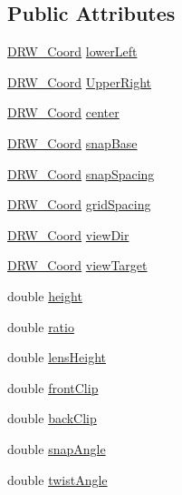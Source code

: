 \subsection*{Public Attributes}
\begin{DoxyCompactItemize}
\item 
\hyperlink{class_d_r_w___coord}{D\+R\+W\+\_\+\+Coord} \hyperlink{class_d_r_w___vport_a27df49d3aacabe83be11ac29463f75c1}{lower\+Left}
\item 
\hyperlink{class_d_r_w___coord}{D\+R\+W\+\_\+\+Coord} \hyperlink{class_d_r_w___vport_ae63541133c20a69a6e13f25191e02b05}{Upper\+Right}
\item 
\hyperlink{class_d_r_w___coord}{D\+R\+W\+\_\+\+Coord} \hyperlink{class_d_r_w___vport_a56104afc60b9fb0b8c6682982f92a45e}{center}
\item 
\hyperlink{class_d_r_w___coord}{D\+R\+W\+\_\+\+Coord} \hyperlink{class_d_r_w___vport_a152be2cc28b499c29e9302efa54e001c}{snap\+Base}
\item 
\hyperlink{class_d_r_w___coord}{D\+R\+W\+\_\+\+Coord} \hyperlink{class_d_r_w___vport_a19aa53d1282cb737b21fa3d3b60d3b20}{snap\+Spacing}
\item 
\hyperlink{class_d_r_w___coord}{D\+R\+W\+\_\+\+Coord} \hyperlink{class_d_r_w___vport_a0284747ef8bda7287e99534d9fdc75e5}{grid\+Spacing}
\item 
\hyperlink{class_d_r_w___coord}{D\+R\+W\+\_\+\+Coord} \hyperlink{class_d_r_w___vport_a657f3b92d041527a5a485dce22c448a1}{view\+Dir}
\item 
\hyperlink{class_d_r_w___coord}{D\+R\+W\+\_\+\+Coord} \hyperlink{class_d_r_w___vport_a93eb77539e5ad11990b828074685d85f}{view\+Target}
\item 
double \hyperlink{class_d_r_w___vport_aae2ac1375b707a159d317051a9ff4e9e}{height}
\item 
double \hyperlink{class_d_r_w___vport_ab84331826a4e1bd181eb2ca6a55e4a97}{ratio}
\item 
double \hyperlink{class_d_r_w___vport_a9d3e2b640f9f9791d50b00f5cae452f9}{lens\+Height}
\item 
double \hyperlink{class_d_r_w___vport_a2ee10a71212915501bfdbaa532ec7107}{front\+Clip}
\item 
double \hyperlink{class_d_r_w___vport_a160e2ab229be33a622e4f888eb4295c7}{back\+Clip}
\item 
double \hyperlink{class_d_r_w___vport_a1709ba5680cf5b0bf9c7b41bab479225}{snap\+Angle}
\item 
double \hyperlink{class_d_r_w___vport_a2705ee0b61e21b33cad269b71c04b86c}{twist\+Angle}

\end{DoxyCompactItemize}
